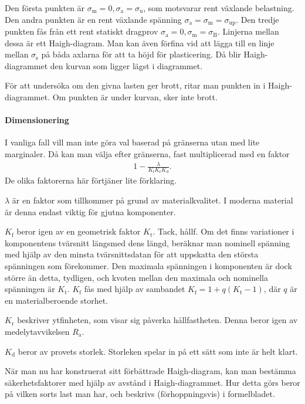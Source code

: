 Den första punkten är $\sigma_{\text{m}} = 0, \sigma_{\text{a}} = \sigma_{\text{u}}$, som motsvarar rent växlande belastning. Den andra punkten är en rent växlande spänning $\sigma_{\text{a}} = \sigma_{\text{m}} = \sigma_{\text{up}}$. Den tredje punkten fås från ett rent statiskt dragprov $\sigma_{\text{a}} = 0, \sigma_{\text{m}} = \sigma_{\text{B}}$. Linjerna mellan dessa är ett Haigh-diagram. Man kan även förfina vid att lägga till en linje mellan $\sigma_{\text{s}}$ på båda axlarna för att ta höjd för plasticering. Då blir Haigh-diagrammet den kurvan som ligger lägst i diagrammet.

För att undersöka om den givna lasten ger brott, ritar man punkten in i Haigh-diagrammet. Om punkten är under kurvan, sker inte brott.

\paragraph{Dimensionering}
I vanliga fall vill man inte göra val baserad på gränserna utan med lite marginaler. Då kan man välja efter gränserna, fast multiplicerad med en faktor
\begin{align*}
	1 - \frac{\lambda}{K_{\text{f}}K_{\text{r}}K_{\text{d}}}.
\end{align*}
De olika faktorerna här förtjäner lite förklaring.

$\lambda$ är en faktor som tillkommer på grund av materialkvalitet. I moderna material är denna endast viktig för gjutna komponenter.

$K_{\text{f}}$ beror igen av en geometrisk faktor $K_{\text{t}}$. Tack, hållf. Om det finns variationer i komponentens tvärsnitt längsmed dens längd, beräknar man nominell spänning med hjälp av den minsta tvärsnittsdatan för att uppskatta den största spänningen som förekommer. Den maximala spänningen i komponenten är dock större än detta, tydligen, och kvoten mellan den maximala och nominella spänningen är $K_{\text{t}}$. $K_{\text{f}}$ fås med hjälp av sambandet $K_{\text{f}} = 1 + q(K_{\text{t}} - 1)$, där $q$ är en materialberoende storhet.

$K_{\text{r}}$ beskriver ytfinheten, som visar sig påverka hållfastheten. Denna beror igen av medelytavvikelsen $R_{\text{a}}$.

$K_{\text{d}}$ beror av provets storlek. Storleken spelar in på ett sätt som inte är helt klart.

När man nu har konstruerat sitt förbättrade Haigh-diagram, kan man bestämma säkerhetsfaktorer med hjälp av avstånd i Haigh-diagrammet. Hur detta görs beror på vilken sorts last man har, och beskrivs (förhoppningsvis) i formelbladet.

